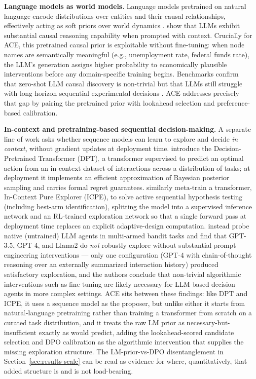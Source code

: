 \documentclass{article}
\theoremstyle{plain}
\theoremstyle{definition}
\theoremstyle{remark}
\begin{document}
\textbf{Language models as world models.} Language models pretrained on natural language encode distributions over entities and their causal relationships, effectively acting as soft priors over world dynamics \citep{hao2023reasoning,xie2022explanation}. \citet{kiciman2023causal} show that LLMs exhibit substantial causal reasoning capability when prompted with context. Crucially for ACE, this pretrained causal prior is exploitable without fine-tuning: when node names are semantically meaningful (e.g., unemployment rate, federal funds rate), the LLM's generation assigns higher probability to economically plausible interventions before any domain-specific training begins. Benchmarks confirm that zero-shot LLM causal discovery is non-trivial \citep{llm_science_survey2025} but that LLMs still struggle with long-horizon sequential experimental decisions \citep{boxinggym2025,autobench2025}. ACE addresses precisely that gap by pairing the pretrained prior with lookahead selection and preference-based calibration.

\textbf{In-context and pretraining-based sequential decision-making.} A separate line of work asks whether sequence models can learn to explore and decide \emph{in context}, without gradient updates at deployment time. \citet{lee2023supervised} introduce the Decision-Pretrained Transformer (DPT), a transformer supervised to predict an optimal action from an in-context dataset of interactions across a distribution of tasks; at deployment it implements an efficient approximation of Bayesian posterior sampling and carries formal regret guarantees. \citet{russo2025incontext} similarly meta-train a transformer, In-Context Pure Explorer (ICPE), to solve active sequential hypothesis testing (including best-arm identification), splitting the model into a supervised inference network and an RL-trained exploration network so that a single forward pass at deployment time replaces an explicit adaptive-design computation. \citet{krishnamurthy2024explore} instead probe native (untrained) LLM agents in multi-armed bandit tasks and find that GPT-3.5, GPT-4, and Llama2 do \emph{not} robustly explore without substantial prompt-engineering interventions --- only one configuration (GPT-4 with chain-of-thought reasoning over an externally summarized interaction history) produced satisfactory exploration, and the authors conclude that non-trivial algorithmic interventions such as fine-tuning are likely necessary for LLM-based decision agents in more complex settings. ACE sits between these findings: like DPT and ICPE, it uses a sequence model as the proposer, but unlike either it starts from natural-language pretraining rather than training a transformer from scratch on a curated task distribution, and it treats the raw LM prior as necessary-but-insufficient exactly as \citet{krishnamurthy2024explore} would predict, adding the lookahead-scored candidate selection and DPO calibration as the algorithmic intervention that supplies the missing exploration structure. The LM-prior-vs-DPO disentanglement in Section~\ref{sec:results-scale} can be read as evidence for where, quantitatively, that added structure is and is not load-bearing.
\end{document}
